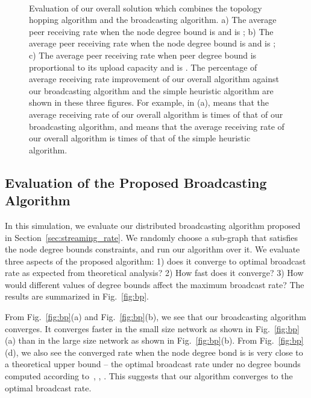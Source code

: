 \documentclass[10pt,conference]{IEEEtran}
\begin{document}
\begin{figure*}[hbt!]
\centering \mbox{
} \\
\caption{Evaluation of our overall solution which combines the topology hopping algorithm and the broadcasting algorithm. a) The average peer receiving rate when the node degree bound is  and  is ; b) The average peer receiving rate when the node degree bound is  and  is ; c) The average peer receiving rate when peer degree bound is proportional to its upload capacity and  is . The percentage of average receiving rate improvement of our overall algorithm against our broadcasting algorithm and the simple heuristic algorithm are shown in these three figures. For example, in (a),  means that the average receiving rate of our overall algorithm is  times of that of our broadcasting algorithm, and  means that the average receiving rate of our overall algorithm is  times of that of the simple heuristic algorithm.}
\end{figure*}


\subsection{Evaluation of the Proposed Broadcasting Algorithm }

In this simulation, we evaluate our distributed broadcasting algorithm
proposed in Section~\ref{sec:streaming_rate}. We randomly choose a sub-graph that satisfies the node degree bounds constraints, and run our algorithm over it. We evaluate three aspects of the proposed algorithm: 1) does it converge to optimal broadcast rate as expected from theoretical analysis? 2) How fast does it converge?
3) How would different values of degree bounds affect the maximum
broadcast rate? The results are summarized in Fig.~\ref{fig:bp}.

From Fig.~\ref{fig:bp}(a) and Fig.~\ref{fig:bp}(b), we see that our broadcasting algorithm converges. It converges faster in the small size network as shown in Fig.~\ref{fig:bp}(a) than in the large size network as shown in Fig.~\ref{fig:bp}(b). From  Fig.~\ref{fig:bp}(d), we also see the converged rate when the node degree bond is  is very close to a theoretical upper bound -- the optimal broadcast rate under no degree bounds computed according to~\cite{all:Mutualcast:LPZ05}, \cite{chen2008ump}, \cite{all:P2PStreaming:KLR.07}. This suggests that our algorithm converges to the optimal broadcast rate.
\end{document}

